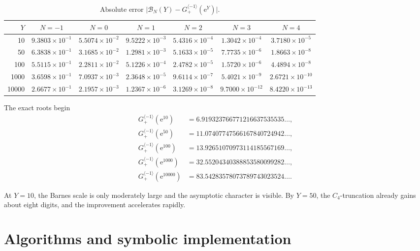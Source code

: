 \documentclass[11pt,a4paper]{article}
\numberwithin{equation}{section}
\theoremstyle{definition}
\theoremstyle{remark}
\newcommand{\e}{\mathrm e}
\newcommand{\cinv}{\langle-1\rangle}
\begin{document}
\begin{table}[htbp]
\centering
\caption{Absolute error \(\lvert\mathcal B_N(Y)-G_+^{\cinv}(\e^Y)\rvert\).}
\label{tab:barnes-errors}
\scriptsize
\setlength{\tabcolsep}{3.0pt}
\begin{tabular}{rcccccc}
\toprule
\(Y\) & \(N=-1\) & \(N=0\) & \(N=1\) & \(N=2\) & \(N=3\) & \(N=4\)\\
\midrule
10
& \(9.3803\!\times10^{-1}\) & \(5.5074\!\times10^{-2}\)
& \(9.5222\!\times10^{-3}\) & \(5.4316\!\times10^{-4}\)
& \(1.3042\!\times10^{-4}\) & \(3.7180\!\times10^{-5}\)\\
50
& \(6.3838\!\times10^{-1}\) & \(3.1685\!\times10^{-2}\)
& \(1.2981\!\times10^{-3}\) & \(5.1633\!\times10^{-5}\)
& \(7.7735\!\times10^{-6}\) & \(1.8663\!\times10^{-8}\)\\
100
& \(5.5115\!\times10^{-1}\) & \(2.2811\!\times10^{-2}\)
& \(5.1226\!\times10^{-4}\) & \(2.4782\!\times10^{-5}\)
& \(1.5720\!\times10^{-6}\) & \(4.4894\!\times10^{-8}\)\\
1000
& \(3.6598\!\times10^{-1}\) & \(7.0937\!\times10^{-3}\)
& \(2.3648\!\times10^{-5}\) & \(9.6114\!\times10^{-7}\)
& \(5.4021\!\times10^{-9}\) & \(2.6721\!\times10^{-10}\)\\
10000
& \(2.6677\!\times10^{-1}\) & \(2.1957\!\times10^{-3}\)
& \(1.2367\!\times10^{-6}\) & \(3.1269\!\times10^{-8}\)
& \(9.7000\!\times10^{-12}\) & \(8.4220\!\times10^{-13}\)\\
\bottomrule
\end{tabular}
\end{table}

The exact roots begin
\begin{align*}
 G_+^{\cinv}(\e^{10})&=6.919323766771216637535535\ldots,\\
 G_+^{\cinv}(\e^{50})&=11.07407747566167840724942\ldots,\\
 G_+^{\cinv}(\e^{100})&=13.92651070973114185567169\ldots,\\
 G_+^{\cinv}(\e^{1000})&=32.55204340388853580099282\ldots,\\
 G_+^{\cinv}(\e^{10000})&=83.54283578073789743023524\ldots.
\end{align*}

At \(Y=10\), the Barnes scale is only moderately large and the asymptotic
character is visible.  By \(Y=50\), the \(C_4\)-truncation already gains
about eight digits, and the improvement accelerates rapidly.

\section{Algorithms and symbolic implementation}
\end{document}
